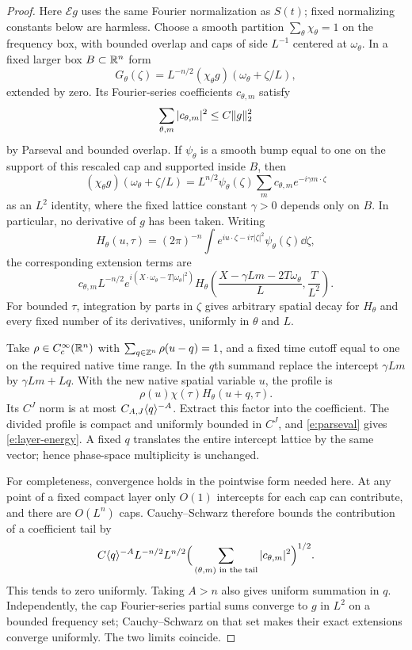 \begin{proof}
Here $\mathcal E g$ uses the same Fourier normalization as $S(t)$; fixed
normalizing constants below are harmless.  Choose a smooth partition
$\sum_\theta\chi_\theta=1$ on the frequency box, with bounded overlap and
caps of side $L^{-1}$ centered at $\omega_\theta$.  In a fixed larger box
$B\subset\mathbb R^n$ form
\[
 G_\theta(\zeta)=L^{-n/2}
        (\chi_\theta g)(\omega_\theta+\zeta/L),
\]
extended by zero.  Its Fourier-series coefficients $c_{\theta,m}$ satisfy
\begin{equation}
 \sum_{\theta,m}|c_{\theta,m}|^2\le C\lVert g\rVert_2^2
 \label{e:parseval}
\end{equation}
by Parseval and bounded overlap.  If $\psi_\theta$ is a smooth bump equal
to one on the support of this rescaled cap and supported inside $B$, then
\[
 (\chi_\theta g)(\omega_\theta+\zeta/L)
   =L^{n/2}\psi_\theta(\zeta)
       \sum_m c_{\theta,m}e^{-i\gamma m\cdot\zeta}
\]
as an $L^2$ identity, where the fixed lattice constant $\gamma>0$ depends
only on $B$.  In particular, no derivative of $g$ has been taken.
Writing
\[
 H_\theta(u,\tau)=(2\pi)^{-n}
   \int e^{iu\cdot\zeta-i\tau|\zeta|^2}
          \psi_\theta(\zeta)\dd\zeta,
\]
the corresponding extension terms are
\begin{equation}
 c_{\theta,m}L^{-n/2}
 e^{i(X\cdot\omega_\theta-T|\omega_\theta|^2)}
 H_\theta\!\left(
   \frac{X-\gamma Lm-2T\omega_\theta}{L},\frac{T}{L^2}\right).
 \label{e:exact-packet}
\end{equation}
For bounded $\tau$, integration by parts in $\zeta$ gives arbitrary
spatial decay for $H_\theta$ and every fixed number of its derivatives,
uniformly in $\theta$ and $L$.

Take $\rho\in C_c^\infty(\mathbb R^n)$ with
$\sum_{q\in\mathbb Z^n}\rho(u-q)=1$, and a fixed time cutoff equal to one on
the required native time range.  In the $q$th summand replace the
intercept $\gamma Lm$ by $\gamma Lm+Lq$.  With the new native spatial
variable $u$, the profile is
\[
 \rho(u)\chi(\tau)H_\theta(u+q,\tau).
\]
Its $C^J$ norm is at most $C_{A,J}\langle q\rangle^{-A}$.  Extract this factor
into the coefficient.  The divided profile is compact and uniformly
bounded in $C^J$, and \eqref{e:parseval} gives
\eqref{e:layer-energy}.  A fixed $q$ translates the entire intercept
lattice by the same vector; hence phase-space multiplicity is unchanged.

For completeness, convergence holds in the pointwise form needed here.
At any point of a fixed compact layer only $O(1)$ intercepts for each
cap can contribute, and there are $O(L^n)$ caps.  Cauchy--Schwarz therefore
bounds the contribution of a coefficient tail by
\[
 C\langle q\rangle^{-A}L^{-n/2}L^{n/2}
       \Big(\sum_{(\theta,m)\text{ in the tail}}
                    |c_{\theta,m}|^2\Big)^{1/2}.
\]
This tends to zero uniformly.  Taking $A>n$ also gives uniform summation
in $q$.  Independently, the cap Fourier-series partial sums converge to
$g$ in $L^2$ on a bounded frequency set; Cauchy--Schwarz on that set makes
their exact extensions converge uniformly.  The two limits coincide.


\end{proof}
